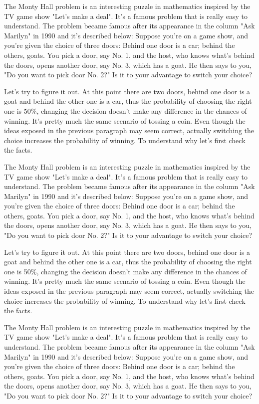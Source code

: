 \documentclass{oscmjournal}
\begin{document}
The Monty Hall problem is an interesting puzzle in mathematics inspired by the TV  game show "Let's make a deal". It's a famous problem that is really easy to understand. The problem became famous after its appearance in the column "Ask Marilyn" in 1990 and  it's described below: Suppose you're on a game show, and you're given the choice of three doors: Behind one  door is a car; behind the others, goats. You pick a door, say No. 1, and the host, who  knows what's behind the doors, opens another door, say No. 3, which has a goat. He then  says to you, "Do you want to pick door No. 2?" Is it to your advantage to switch your choice?

Let's try to figure it out. At this point there are two doors, behind one door is a goat  and behind the other one is a car, thus the probability of choosing the right one is 50\%, changing the decision doesn't make any difference in the chances of winning. It's pretty much the same scenario of tossing a coin. Even though the ideas exposed in the previous paragraph may seem correct, actually switching the choice increases the probability of winning. To understand why let's  first check the facts.

The Monty Hall problem is an interesting puzzle in mathematics inspired by the TV  game show "Let's make a deal". It's a famous problem that is really easy to understand. The problem became famous after its appearance in the column "Ask Marilyn" in 1990 and  it's described below: Suppose you're on a game show, and you're given the choice of three doors: Behind one  door is a car; behind the others, goats. You pick a door, say No. 1, and the host, who  knows what's behind the doors, opens another door, say No. 3, which has a goat. He then  says to you, "Do you want to pick door No. 2?" Is it to your advantage to switch your choice?

Let's try to figure it out. At this point there are two doors, behind one door is a goat  and behind the other one is a car, thus the probability of choosing the right one is 50\%, changing the decision doesn't make any difference in the chances of winning. It's pretty much the same scenario of tossing a coin. Even though the ideas exposed in the previous paragraph may seem correct, actually switching the choice increases the probability of winning. To understand why let's  first check the facts.

The Monty Hall problem is an interesting puzzle in mathematics inspired by the TV  game show "Let's make a deal". It's a famous problem that is really easy to understand. The problem became famous after its appearance in the column "Ask Marilyn" in 1990 and  it's described below: Suppose you're on a game show, and you're given the choice of three doors: Behind one  door is a car; behind the others, goats. You pick a door, say No. 1, and the host, who  knows what's behind the doors, opens another door, say No. 3, which has a goat. He then  says to you, "Do you want to pick door No. 2?" Is it to your advantage to switch your choice?
\end{document}
